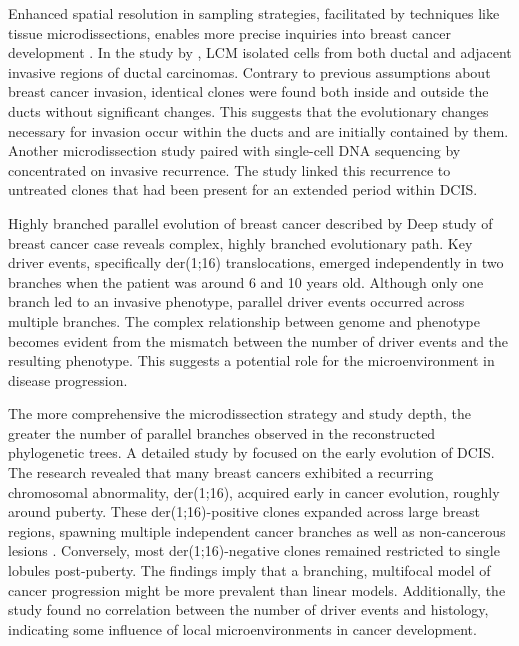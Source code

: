 Enhanced spatial resolution in sampling strategies, facilitated by techniques like tissue microdissections, enables more precise inquiries into breast cancer development . In the study by \textcite{Casasent2018-gx}, \ac{LCM} isolated cells from both ductal and adjacent invasive regions of ductal carcinomas. Contrary to previous assumptions about breast cancer invasion, identical clones were found both inside and outside the ducts without significant changes. This suggests that the evolutionary changes necessary for invasion occur within the ducts and are initially contained by them. Another microdissection study paired with single-cell DNA sequencing by \textcite{Lips2022-kv} concentrated on invasive recurrence. The study linked this recurrence to untreated clones that had been present for an extended period within \ac{DCIS}.

{Highly branched parallel evolution of breast cancer described by \textcite{Nishimura2023-mk}}
{Deep study of breast cancer case reveals complex, highly branched evolutionary path. Key driver events, specifically der(1;16) translocations, emerged independently in two branches when the patient was around 6 and 10 years old. Although only one branch led to an invasive phenotype, parallel driver events occurred across multiple branches. The complex relationship between genome and phenotype becomes evident from the mismatch between the number of driver events and the resulting phenotype. This suggests a potential role for the microenvironment in disease progression. }

The more comprehensive the microdissection strategy and study depth, the greater the number of parallel branches observed in the reconstructed phylogenetic trees. A detailed study by \parencite{Nishimura2023-mk} focused on the early evolution of \ac{DCIS}. The research revealed that many breast cancers exhibited a recurring chromosomal abnormality, der(1;16), acquired early in cancer evolution, roughly around puberty. These der(1;16)-positive clones expanded across large breast regions, spawning multiple independent cancer branches as well as non-cancerous lesions . Conversely, most der(1;16)-negative clones remained restricted to single lobules post-puberty. The findings imply that a branching, multifocal model of cancer progression might be more prevalent than linear models. Additionally, the study found no correlation between the number of driver events and histology, indicating some influence of local microenvironments in cancer development.

